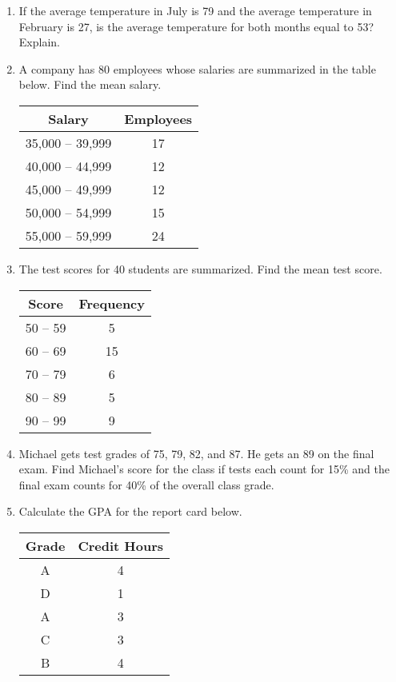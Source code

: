 \documentclass{article}
\begin{document}
\begin{enumerate}
    \item If the average temperature in July is 79 and the average temperature in February is 27, is the average temperature for both months equal to 53? Explain.
    
    \item A company has 80 employees whose salaries are summarized in the table below. Find the mean salary.
    \begin{center}
    \begin{tabular}{c|c}
        \textbf{Salary} & \textbf{Employees} \\ \hline 
        35,000 -- 39,999 & 17 \\
        40,000 -- 44,999 & 12 \\
        45,000 -- 49,999 & 12 \\
        50,000 -- 54,999 & 15 \\
        55,000 -- 59,999 & 24 
    \end{tabular}
    \end{center}
    
    \item The test scores for 40 students are summarized. Find the mean test score.
    \begin{center}
    \begin{tabular}{c|c}
    \textbf{Score} & \textbf{Frequency} \\ \hline 
        50 -- 59 & 5 \\
        60 -- 69 & 15 \\
        70 -- 79 & 6 \\
        80 -- 89 & 5 \\
        90 -- 99 & 9
    \end{tabular}
    \end{center}
    
    \item Michael gets test grades of 75, 79, 82, and 87. He gets an 89 on the final exam. Find Michael's score for the class if tests each count for 15\% and the final exam counts for 40\% of the overall class grade.
    
    \item Calculate the GPA for the report card below.
    \begin{center}
    \begin{tabular}{c|c}
        \textbf{Grade} & \textbf{Credit Hours} \\ \hline 
        A & 4 \\
        D & 1 \\
        A & 3 \\
        C & 3 \\
        B & 4 \\
    \end{tabular}
    \end{center}
    
\end{enumerate}
\end{document}
